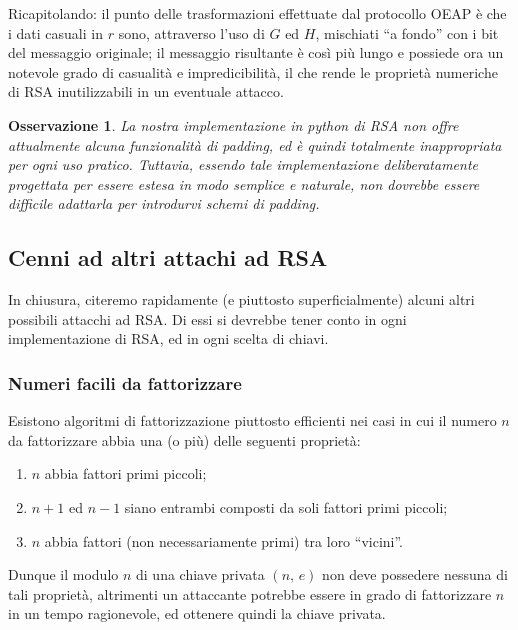 \documentclass[pdflatex,11pt,a4paper,oneside]{article}
\newtheorem{remark}[TheoremLike]{Osservazione}
\begin{document}
Ricapitolando: il punto delle trasformazioni effettuate dal protocollo
OEAP \`e che i dati casuali in $r$ sono, attraverso l'uso di $G$ ed $H$,
mischiati ``a fondo'' con i bit del messaggio originale; il messaggio
risultante \`e cos\`i pi\`u lungo e possiede ora un notevole grado di
casualit\`a e impredicibilit\`a, il che rende le propriet\`a numeriche
di RSA inutilizzabili in un eventuale attacco.

\begin{remark}
La nostra implementazione in python di RSA non offre
attualmente alcuna funzionalit\`a di padding, ed \`e quindi totalmente
inappropriata per ogni uso pratico.  Tuttavia, essendo tale
implementazione deliberatamente progettata per essere estesa in modo
semplice e naturale, non dovrebbe essere difficile adattarla per
introdurvi schemi di padding.
\end{remark}

\subsection{Cenni ad altri attachi ad RSA}\label{sect:rsa-attacks}

In chiusura, citeremo rapidamente (e piuttosto superficialmente) alcuni
altri possibili attacchi ad RSA. Di essi si devrebbe tener conto in ogni
implementazione di RSA, ed in ogni scelta di chiavi.

\subsubsection{Numeri facili da fattorizzare}

Esistono algoritmi di fattorizzazione piuttosto efficienti nei casi
in cui il numero $n$ da fattorizzare abbia una (o pi\`u) delle seguenti
propriet\`a:

\begin{enumerate}
\item $n$ abbia fattori primi piccoli;
\item $n + 1$ ed $n - 1$ siano entrambi composti da soli fattori primi
      piccoli;
\item $n$ abbia fattori (non necessariamente primi) tra loro ``vicini''.
\label{item:fermat-vulnerable}
\end{enumerate}

Dunque il modulo $n$ di una chiave privata $(n,\,e)$ non deve possedere
nessuna di tali propriet\`a, altrimenti un attaccante potrebbe essere in
grado di fattorizzare $n$ in un tempo ragionevole, ed ottenere quindi
la chiave privata.
\end{document}
